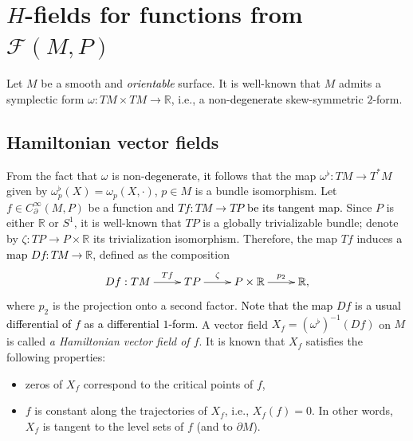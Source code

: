 \documentclass[10pt,reqno]{amsart}
\newcommand{\bbR}{\mathbb{R}}
\newcommand{\F}{\mathcal{F}(M,P)}
\newcommand{\textr}[1]{\textcolor{black}{#1}}
\begin{document}
\section{$H$-fields for functions from $\F$}\label{sec:H-fileds}
Let $M$ be a smooth and {\it \textr{orientable}} surface.
It is well-known that $M$ admits a symplectic form $\omega:TM\times TM\to \bbR$, i.e., a non-\textr{degenerate} skew-symmetric $2$-form.
\subsection{Hamiltonian vector fields}\label{ssec:Ham-skew}
 From the fact that $\omega$ is non-\textr{degenerate}, \textr{it} follows that the map $\omega^{\flat}:TM\to T^*M$ given by $\omega^{\flat}_p(X) = \omega_p(X,\cdot)$,  $p\in M$ is a bundle isomorphism.  Let $f\in C^{\infty}_{\partial}(M,P)$ be a function and \textr{$Tf:TM\to TP$ be its tangent map.}
Since $P$ is either $\bbR$ or $S^1$, it is well-known that  $TP$ is a globally trivializable bundle; denote by $\zeta:TP\to P\times \bbR$  its trivialization isomorphism. Therefore, the map $Tf$  induces  \textr{a map $Df:TM\to \bbR$}, defined as the composition 
$$
\xymatrix{
Df:TM\ar[r]^-{Tf} & TP \ar[r]^-{\zeta}& P\times \bbR \ar[r]^-{p_2}& \bbR,
}
$$ 
where $p_2$ is the projection onto a second factor. \textr{Note that the map $Df$ is a usual differential of $f$ as a differential $1$-form.}
 A vector field $X_f = (\omega^{\flat})^{-1}(Df)$ on $M$ is called {\it a Hamiltonian vector field of $f$}. It is known that $X_f$ satisfies the following properties:
\begin{itemize}
	\item zeros of $X_f$ correspond to the critical points of $f$,
	\item $f$ is constant along the trajectories of $X_f$, i.e., $X_f(f) = 0.$ In other words, $X_f$ is tangent to the level sets of $f$ (and to $\partial M$).
\end{itemize}
\end{document}
